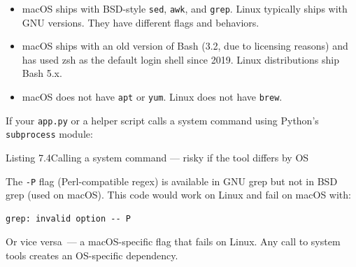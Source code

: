 \begin{itemize}
\tightlist
\item
  macOS ships with BSD-style \texttt{sed}, \texttt{awk}, and \texttt{grep}. Linux typically ships with GNU versions. They have different flags and behaviors.
\item
  macOS ships with an old version of Bash (3.2, due to licensing reasons) and has used zsh as the default login shell since 2019. Linux distributions ship Bash 5.x.
\item
  macOS does not have \texttt{apt} or \texttt{yum}. Linux does not have \texttt{brew}.
\end{itemize}

\noindent{}If your \texttt{app.py} or a helper script calls a system command using Python's \texttt{subprocess} module:

\begin{codeboxcap}[short]{\textcolor{accent}{Listing 7.4}\enspace Calling a system command --- risky if the tool differs by OS}

\begin{Shaded}
\begin{Highlighting}[]

\OperatorTok{=}
\NormalTok{    [}\NormalTok{, }\NormalTok{, }\NormalTok{, }\NormalTok{],  }
\OperatorTok{=}\NormalTok{,}
\OperatorTok{=}
\NormalTok{)}
\end{Highlighting}
\end{Shaded}

\end{codeboxcap}

\noindent{}The \texttt{-P} flag (Perl-compatible regex) is available in GNU grep but not in BSD grep (used on macOS). This code would work on Linux and fail on macOS with:

\begin{outputbox}[short]
\begin{Verbatim}[fontsize=\codesize, breaklines, breakanywhere, breaksymbolleft={\tiny\textcolor{muted}{$\hookrightarrow$}}]
grep: invalid option -- P
\end{Verbatim}
\end{outputbox}

\noindent{}Or vice versa~--- a macOS-specific flag that fails on Linux. Any call to system tools creates an OS-specific dependency.

